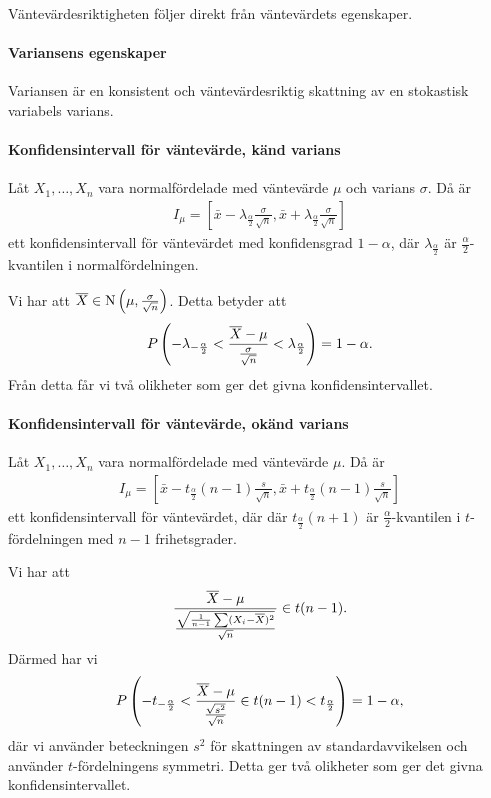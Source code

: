 \proof
Väntevärdesriktigheten följer direkt från väntevärdets egenskaper.

\paragraph{Variansens egenskaper}
Variansen är en konsistent och väntevärdesriktig skattning av en stokastisk variabels varians.

\proof

\paragraph{Konfidensintervall för väntevärde, känd varians}
Låt $X_1, \dots, X_{n}$ vara normalfördelade med väntevärde $\mu$ och varians $\sigma$. Då är
\begin{align*}
	I_{\mu} = \left[\bar{x} - \lambda_{\frac{\alpha}{2}}\frac{\sigma}{\sqrt{n}}, \bar{x} + \lambda_{\frac{\alpha}{2}}\frac{\sigma}{\sqrt{n}}\right]
\end{align*}
ett konfidensintervall för väntevärdet med konfidensgrad $1 - \alpha$, där $\lambda_{\frac{\alpha}{2}}$ är $\frac{\alpha}{2}$-kvantilen i normalfördelningen.

\proof
Vi har att $\overline{X}\in\text{N}\left(\mu, \frac{\sigma}{\sqrt{n}}\right)$. Detta betyder att
\begin{align*}
	P\left(-\lambda_{-\frac{\alpha}{2}} < \frac{\overline{X} - \mu}{\frac{\sigma}{\sqrt{n}}} < \lambda_{\frac{\alpha}{2}}\right) = 1 - \alpha.
\end{align*}
Från detta får vi två olikheter som ger det givna konfidensintervallet.

\paragraph{Konfidensintervall för väntevärde, okänd varians}
Låt $X_1, \dots, X_{n}$ vara normalfördelade med väntevärde $\mu$. Då är
\begin{align*}
	I_{\mu} = \left[\bar{x} - t_{\frac{\alpha}{2}}(n - 1)\frac{s}{\sqrt{n}}, \bar{x} + t_{\frac{\alpha}{2}}(n - 1)\frac{s}{\sqrt{n}}\right]
\end{align*}
ett konfidensintervall för väntevärdet, där där $t_{\frac{\alpha}{2}}(n + 1)$ är $\frac{\alpha}{2}$-kvantilen i $t$-fördelningen med $n - 1$ frihetsgrader.

\proof
Vi har att
\begin{align*}
	\frac{\overline{X} - \mu}{\frac{\sqrt{\frac{1}{n - 1}\sum (X_i - \overline{X})^2}}{\sqrt{n}}}\in t(n - 1).
\end{align*}
Därmed har vi
\begin{align*}
	P\left(-t_{-\frac{\alpha}{2}} < \frac{\overline{X} - \mu}{\frac{\sqrt{s^2}}{\sqrt{n}}}\in t(n - 1) < t_{\frac{\alpha}{2}}\right) = 1 - \alpha,
\end{align*}
där vi använder beteckningen $s^2$ för skattningen av standardavvikelsen och använder $t$-fördelningens symmetri. Detta ger två olikheter som ger det givna konfidensintervallet.

